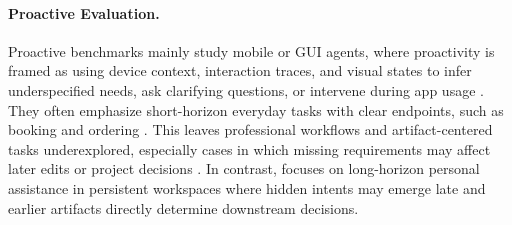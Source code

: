 \paragraph{Proactive Evaluation.}
Proactive benchmarks mainly study mobile or GUI agents, where proactivity is framed as using device context, interaction traces, and visual states to infer underspecified needs, ask clarifying questions, or intervene during app usage \citep{chen2026knowu,sun2026ambibench,nathani2026proactive}.
They often emphasize short-horizon everyday tasks with clear endpoints, such as booking and ordering \citep{kong2026proactivemobile,chai2026pira,nie2026pspa}. 
This leaves professional workflows and artifact-centered tasks underexplored, especially cases in which missing requirements may affect later edits or project decisions \citep{openclaw,zhang2026clawbench}.
In contrast, {\bench} focuses on long-horizon personal assistance in persistent workspaces where hidden intents may emerge late and earlier artifacts directly determine downstream decisions.
